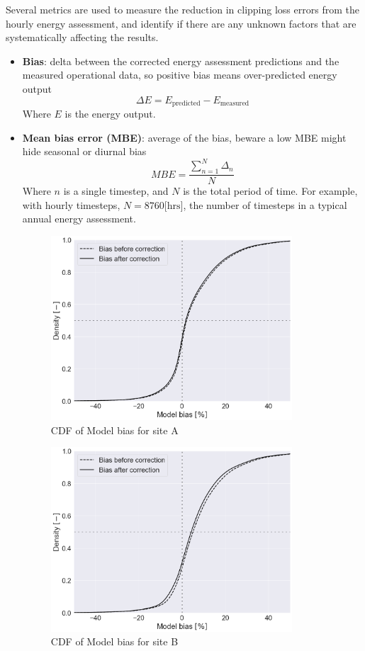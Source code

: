 \documentclass[conference]{IEEEtran}
\begin{document}
Several metrics are used to measure the reduction in clipping loss errors from the hourly energy assessment, and identify if there are any unknown factors that are systematically affecting the results.

\begin{itemize}
\item \textbf{Bias}: delta between the corrected energy assessment predictions and the measured operational data, so positive bias means over-predicted energy output 
\begin{equation}
\Delta E={E_\text{predicted}} - {E_\text{measured}}\label{eq:bias}
\end{equation}
Where $E$ is the energy output.
\item \textbf{Mean bias error (MBE)}: average of the bias, beware a low MBE might hide seasonal or diurnal bias
\begin{equation}
\mathit{MBE}=\frac{\sum_{n=1}^N{\Delta_n}}{N}\label{eq:mbe}
\end{equation}
Where $n$ is a single timestep, and $N$ is the total period of time. For example, with hourly timesteps, $N=8760\text{[hrs]}$, the number of timesteps in a typical annual energy assessment.


\begin{figure}[htbp]
\centerline{\includegraphics[width=9cm]{DCS_ModelBias_CDF.png}}
\caption{CDF of Model bias for site A}
\label{fig:irradiance-and-power}
\end{figure}

\begin{figure}[htbp]
\centerline{\includegraphics[width=9cm]{PAW_ModelBias_CDF.png}}
\caption{CDF of Model bias for site B}
\label{fig:irradiance-and-power}
\end{figure}


\end{itemize}
\end{document}
